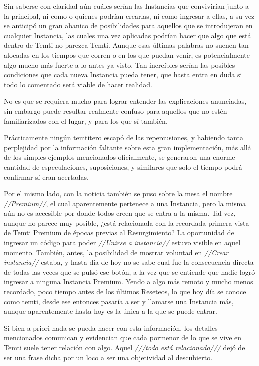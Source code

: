 \documentclass[
  spanish,
]{book}
\begin{document}
Sin saberse con claridad aún cuáles serían las Instancias que convivirían junto a la principal, ni como o quienes podrían crearlas, ni como ingresar a ellas, a su vez se anticipó un gran abanico de posibilidades para aquellos que se introdujeran en cualquier Instancia, las cuales una vez aplicadas podrían hacer que algo que está dentro de Temti no parezca Temti. Aunque esas últimas palabras no suenen tan alocadas en los tiempos que corren o en los que puedan venir, es potencialmente algo mucho más fuerte a lo antes ya visto. Tan increíbles serían las posibles condiciones que cada nueva Instancia pueda tener, que hasta entra en duda si todo lo comentado será viable de hacer realidad.

No es que se requiera mucho para lograr entender las explicaciones anunciadas, sin embargo puede resultar realmente confuso para aquellos que no estén familiarizados con el lugar, y para los que sí también.

Prácticamente ningún temtitero escapó de las repercusiones, y habiendo tanta perplejidad por la información faltante sobre esta gran implementación, más allá de los simples ejemplos mencionados oficialmente, se generaron una enorme cantidad de especulaciones, suposiciones, y similares que solo el tiempo podrá confirmar sí eran acertadas.

Por el mismo lado, con la noticia también se puso sobre la mesa el nombre \emph{//Premium//}, el cual aparentemente pertenece a una Instancia, pero la misma aún no es accesible por donde todos creen que se entra a la misma. Tal vez, aunque no parece muy posible, ¿está relacionada con la recordada primera vista de Temti Premium de épocas previas al Resurgimiento? La oportunidad de ingresar un código para poder \emph{//Unirse a instancia//} estuvo visible en aquel momento. También, antes, la posibilidad de mostrar voluntad en \emph{//Crear instancia//} estaba, y hasta día de hoy no se sabe cual fue la consecuencia directa de todas las veces que se pulsó ese botón, a la vez que se entiende que nadie logró ingresar a ninguna Instancia Premium. Yendo a algo más remoto y mucho menos recordado, poco tiempo antes de los últimos Reseteos, lo que hoy día se conoce como temti, desde ese entonces pasaría a ser y llamarse una Instancia más, aunque aparentemente hasta hoy es la única a la que se puede entrar.

Si bien a priori nada se pueda hacer con esta información, los detalles mencionados comunican y evidencian que cada pormenor de lo que se vive en Temti suele tener relación con algo. Aquel \emph{///todo está relacionado///} dejó de ser una frase dicha por un loco a ser una objetividad al descubierto.
\end{document}

